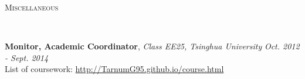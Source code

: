 \documentclass[9pt]{article}
\newenvironment{changemargin}[2]{%
  \begin{list}{}{%
    \setlength{\topsep}{0pt}%
    \setlength{\leftmargin}{#1}%
    \setlength{\rightmargin}{#2}%
    \setlength{\listparindent}{\parindent}%
    \setlength{\itemindent}{\parindent}%
    \setlength{\parsep}{\parskip}%
  }%
  \item[]}{\end{list}
}
\newcommand{\lineover}{
	\begin{changemargin}{-0.05in}{-0.05in}
		\vspace*{-8pt}
		\hrulefill \\
		\vspace*{-2pt}
	\end{changemargin}
}
\newcommand{\header}[1]{
	\begin{changemargin}{-0.5in}{-0.5in}
		\scshape{#1}\\
  	\lineover
	\end{changemargin}
}
\newenvironment{body} {
	\vspace*{-16pt}
	\begin{changemargin}{-0.25in}{-0.5in}
  }	
	{\end{changemargin}
}
\begin{document}
\smallskip
\smallskip






\header{Miscellaneous}

\begin{body}
	\vspace{14pt}
	\textbf {Monitor, Academic Coordinator}, \emph{Class EE25, Tsinghua University} \hfill \emph{Oct. 2012 - Sept. 2014}\\
	\smallskip
	List of coursework: \href{tarnumg95.github.io/course.html}{http://TarnumG95.github.io/course.html}\\


\end{body}

\smallskip
\smallskip
\end{document}
